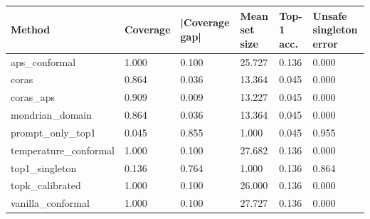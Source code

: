 \begin{tabular}{llllll}
\toprule
Method & Coverage & |Coverage gap| & Mean set size & Top-1 acc. & Unsafe singleton error \\
\midrule
aps\_conformal & 1.000 & 0.100 & 25.727 & 0.136 & 0.000 \\
coras & 0.864 & 0.036 & 13.364 & 0.045 & 0.000 \\
coras\_aps & 0.909 & 0.009 & 13.227 & 0.045 & 0.000 \\
mondrian\_domain & 0.864 & 0.036 & 13.364 & 0.045 & 0.000 \\
prompt\_only\_top1 & 0.045 & 0.855 & 1.000 & 0.045 & 0.955 \\
temperature\_conformal & 1.000 & 0.100 & 27.682 & 0.136 & 0.000 \\
top1\_singleton & 0.136 & 0.764 & 1.000 & 0.136 & 0.864 \\
topk\_calibrated & 1.000 & 0.100 & 26.000 & 0.136 & 0.000 \\
vanilla\_conformal & 1.000 & 0.100 & 27.727 & 0.136 & 0.000 \\
\bottomrule
\end{tabular}
